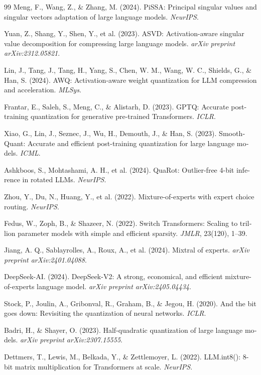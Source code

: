 \documentclass[12pt,a4paper]{report}
\theoremstyle{definition}
\begin{document}
\begin{latin}
\begin{thebibliography}{99}
Meng, F., Wang, Z., \& Zhang, M. (2024).
PiSSA: Principal singular values and singular vectors adaptation of large language models.
\textit{NeurIPS}.

Yuan, Z., Shang, Y., Shen, Y., et al. (2023).
ASVD: Activation-aware singular value decomposition for compressing large language models.
\textit{arXiv preprint arXiv:2312.05821}.

Lin, J., Tang, J., Tang, H., Yang, S., Chen, W. M., Wang, W. C., Shields, G., \& Han, S. (2024).
AWQ: Activation-aware weight quantization for LLM compression and acceleration.
\textit{MLSys}.

Frantar, E., Saleh, S., Meng, C., \& Alistarh, D. (2023).
GPTQ: Accurate post-training quantization for generative pre-trained Transformers.
\textit{ICLR}.

Xiao, G., Lin, J., Seznec, J., Wu, H., Demouth, J., \& Han, S. (2023).
SmoothQuant: Accurate and efficient post-training quantization for large language models.
\textit{ICML}.

Ashkboos, S., Mohtashami, A. H., et al. (2024).
QuaRot: Outlier-free 4-bit inference in rotated LLMs.
\textit{NeurIPS}.

Zhou, Y., Du, N., Huang, Y., et al. (2022).
Mixture-of-experts with expert choice routing.
\textit{NeurIPS}.

Fedus, W., Zoph, B., \& Shazeer, N. (2022).
Switch Transformers: Scaling to trillion parameter models with simple and efficient sparsity.
\textit{JMLR}, 23(120), 1--39.

Jiang, A. Q., Sablayrolles, A., Roux, A., et al. (2024).
Mixtral of experts.
\textit{arXiv preprint arXiv:2401.04088}.

DeepSeek-AI. (2024).
DeepSeek-V2: A strong, economical, and efficient mixture-of-experts language model.
\textit{arXiv preprint arXiv:2405.04434}.

Stock, P., Joulin, A., Gribonval, R., Graham, B., \& Jegou, H. (2020).
And the bit goes down: Revisiting the quantization of neural networks.
\textit{ICLR}.

Badri, H., \& Shayer, O. (2023).
Half-quadratic quantization of large language models.
\textit{arXiv preprint arXiv:2307.15555}.

Dettmers, T., Lewis, M., Belkada, Y., \& Zettlemoyer, L. (2022).
LLM.int8(): 8-bit matrix multiplication for Transformers at scale.
\textit{NeurIPS}.


\end{thebibliography}
\end{latin}
\end{document}
